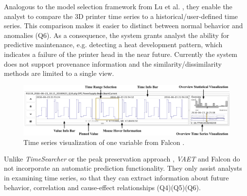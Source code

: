 \documentclass[electronic]{vgtc}             %
\begin{document}
Analogous to the model selection framework from Lu et al. \cite{lu:2014}, they enable the analyst to compare the 3D printer time series to a historical/user-defined time series. 
This comparison makes it easier to distinct between normal behavior and anomalies (Q6). 
As a consequence, the system grants analyst the ability for predictive maintenance, e.g. detecting a heat development pattern, which indicates a failure of the printer head in the near future. 
Currently the system does not support provenance information and the similarity/dissimilarity methods are limited to a single view.

\begin{figure}[t]
	\centering
	\includegraphics[width=\columnwidth]{Falcon}
	\caption{Time series visualization of one variable from Falcon \cite{steed:2017}.
	}
	\label{fig:falcon}
\end{figure}

Unlike \textit{TimeSearcher} \cite{buono:2007} or the peak preservation approach \cite{Hao:2012}, \textit{VAET}  \cite{Xie:2014} and Falcon \cite{steed:2017} do not incorporate an automatic prediction functionality.
They only assist analysts in examining time series, so that they can extract information about future behavior, correlation and cause-effect relationships  (Q4)(Q5)(Q6). 
\end{document}
